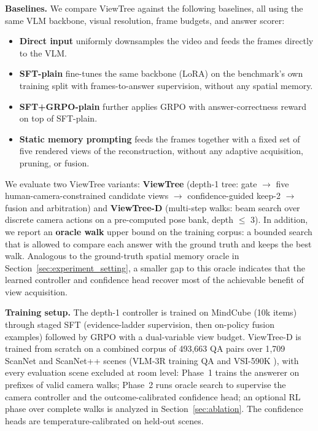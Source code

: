 \noindent\textbf{Baselines.} We compare ViewTree against the following baselines, all using the same VLM backbone, visual resolution, frame budgets, and answer scorer:
\begin{itemize}
    \item \textbf{Direct input} uniformly downsamples the video and feeds the frames directly to the VLM.
    \item \textbf{SFT-plain} fine-tunes the same backbone (LoRA) on the benchmark's own training split with frames-to-answer supervision, without any spatial memory.
    \item \textbf{SFT+GRPO-plain} further applies GRPO with answer-correctness reward on top of SFT-plain.
    \item \textbf{Static memory prompting} feeds the frames together with a fixed set of five rendered views of the reconstruction, without any adaptive acquisition, pruning, or fusion.
\end{itemize}
We evaluate two ViewTree variants: \textbf{ViewTree} (depth-1 tree: gate $\rightarrow$ five human-camera-constrained candidate views $\rightarrow$ confidence-guided keep-2 $\rightarrow$ fusion and arbitration) and \textbf{ViewTree-D} (multi-step walks: beam search over discrete camera actions on a pre-computed pose bank, depth $\le$ 3). In addition, we report an \textbf{oracle walk} upper bound on the training corpus: a bounded search that is allowed to compare each answer with the ground truth and keeps the best walk. Analogous to the ground-truth spatial memory oracle in Section~\ref{sec:experiment_setting}, a smaller gap to this oracle indicates that the learned controller and confidence head recover most of the achievable benefit of view acquisition.

\noindent\textbf{Training setup.} The depth-1 controller is trained on MindCube \cite{mindcube2025} (10k items) through staged SFT (evidence-ladder supervision, then on-policy fusion examples) followed by GRPO with a dual-variable view budget. ViewTree-D is trained from scratch on a combined corpus of 493{,}663 QA pairs over 1{,}709 ScanNet and ScanNet++ scenes (VLM-3R training QA and VSI-590K \cite{yang2025vsi590k}), with every evaluation scene excluded at room level: Phase~1 trains the answerer on prefixes of valid camera walks; Phase~2 runs oracle search to supervise the camera controller and the outcome-calibrated confidence head; an optional RL phase over complete walks is analyzed in Section~\ref{sec:ablation}. The confidence heads are temperature-calibrated on held-out scenes.

